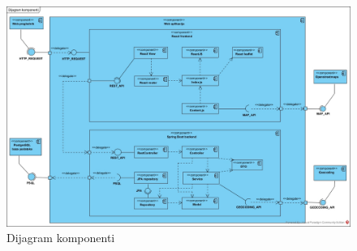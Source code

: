 \begin{figure}[H]
	\includegraphics[scale=0.35]{slike/DK.jpg} %
	\centering
	\caption{Dijagram komponenti}
	\label{fig:DijagramKomponenti}
\end{figure}